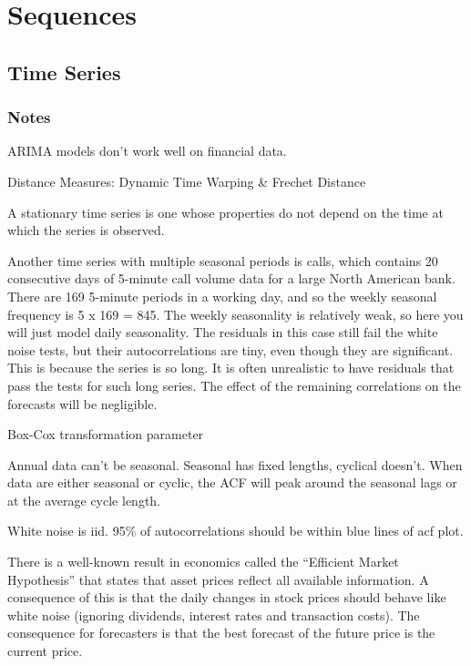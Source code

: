 \documentclass[]{book}
\begin{document}
\hypertarget{sequences-1}{%
\chapter{Sequences}\label{sequences-1}}

\hypertarget{time-series}{%
\section{Time Series}\label{time-series}}

\hypertarget{notes}{%
\subsection{Notes}\label{notes}}

ARIMA models don't work well on financial data.

Distance Measures: Dynamic Time Warping \& Frechet Distance

A stationary time series is one whose properties do not depend on the time at which the series is observed.

Another time series with multiple seasonal periods is calls, which contains 20 consecutive days of 5-minute call volume data for a large North American bank. There are 169 5-minute periods in a working day, and so the weekly seasonal frequency is 5 x 169 = 845. The weekly seasonality is relatively weak, so here you will just model daily seasonality. The residuals in this case still fail the white noise tests, but their autocorrelations are tiny, even though they are significant. This is because the series is so long. It is often unrealistic to have residuals that pass the tests for such long series. The effect of the remaining correlations on the forecasts will be negligible.

Box-Cox transformation parameter

Annual data can't be seasonal. Seasonal has fixed lengths, cyclical doesn't. When data are either seasonal or cyclic, the ACF will peak around the seasonal lags or at the average cycle length.

White noise is iid. 95\% of autocorrelations should be within blue lines of acf plot.

There is a well-known result in economics called the ``Efficient Market Hypothesis'' that states that asset prices reflect all available information. A consequence of this is that the daily changes in stock prices should behave like white noise (ignoring dividends, interest rates and transaction costs). The consequence for forecasters is that the best forecast of the future price is the current price.
\end{document}

